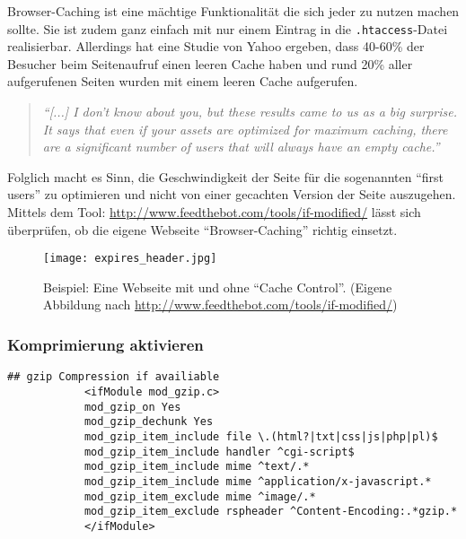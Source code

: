 		  Browser-Caching ist eine mächtige Funktionalität die sich jeder zu nutzen machen sollte. Sie ist zudem ganz einfach mit nur einem Eintrag in die \texttt{.htaccess}-Datei realisierbar. Allerdings hat eine Studie von Yahoo ergeben, dass 40-60\% der Besucher beim Seitenaufruf einen leeren Cache haben und rund 20\% aller aufgerufenen Seiten wurden mit einem leeren Cache aufgerufen.
			\begin{quote}
				\textit{"`[...] I don't know about you, but these results came to us as a big surprise. It says that even if your assets are optimized for maximum caching, there are a significant number of users that will always have an empty cache."'\autocite{yahoo07}}
			\end{quote}

			Folglich macht es Sinn, die Geschwindigkeit der Seite für die sogenannten "`first users"' zu optimieren und nicht von einer gecachten Version der Seite auszugehen.\\
			Mittels dem Tool: \url{http://www.feedthebot.com/tools/if-modified/} lässt sich überprüfen, ob die eigene Webseite "`Browser-Caching"' richtig einsetzt. 
		  \begin{figure}[htbp]
		  	\begin{center}
		  		\texttt{[image: expires\_header.jpg]}
		  		\caption{Beispiel: Eine Webseite mit und ohne "`Cache Control"'. (Eigene Abbildung nach \url{http://www.feedthebot.com/tools/if-modified/})}
		  		\label{fig:expires_header}
		  	\end{center}
		  \end{figure}

		\subsubsection{Komprimierung aktivieren} %
		\label{ssub:komprimierung_aktivieren}
		\begin{lstlisting}[captionpos=b, caption=gzip, label=lst:gzip]
			## gzip Compression if availiable
			<ifModule mod_gzip.c>
			mod_gzip_on Yes
			mod_gzip_dechunk Yes
			mod_gzip_item_include file \.(html?|txt|css|js|php|pl)$
			mod_gzip_item_include handler ^cgi-script$
			mod_gzip_item_include mime ^text/.*
			mod_gzip_item_include mime ^application/x-javascript.*
			mod_gzip_item_exclude mime ^image/.*
			mod_gzip_item_exclude rspheader ^Content-Encoding:.*gzip.*
			</ifModule>
		\end{lstlisting}
			

